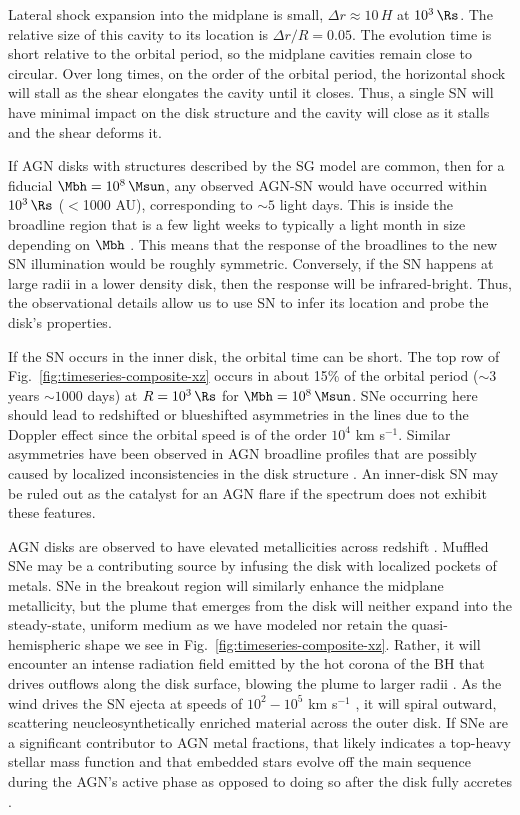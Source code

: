 Lateral shock expansion into the midplane is small, $\Delta r\approx 10\,H$ at $10^3\,\Rs$.
The relative size of this cavity to its location is $\Delta r/R = 0.05$.
The evolution time is short relative to the orbital period, so the midplane cavities remain close to circular.
Over long times, on the order of the orbital period, the horizontal shock will stall as the shear elongates the cavity until it closes.
Thus, a single SN will have minimal impact on the disk structure and the cavity will close as it stalls and the shear deforms it.

If AGN disks with structures described by the SG model are common, then for a fiducial $\Mbh=10^8\,\Msun$, any observed AGN-SN would have occurred within $10^3\,\Rs$ ($<$1000 AU), corresponding to $\sim5$ light days.
This is inside the broadline region that is a few light weeks to typically a light month in size depending on $\Mbh$ \citep{BlandfordMcKee82}.
This means that the response of the broadlines to the new SN illumination would be roughly symmetric.
Conversely, if the SN happens at large radii in a lower density disk, then the response will be infrared-bright.
Thus, the observational details allow us to use SN to infer its location and probe the disk's properties.

If the SN occurs in the inner disk, the orbital time can be short.
The top row of Fig.~\ref{fig:timeseries-composite-xz} occurs in about 15\% of the orbital period ($\sim3$ years $\sim1000$ days) at $R=10^3\,\Rs$ for $\Mbh=10^8\,\Msun$.
SNe occurring here should lead to redshifted or blueshifted asymmetries in the lines due to the Doppler effect since the orbital speed is of the order $10^4$ km s$^{-1}$.
Similar asymmetries have been observed in AGN broadline profiles that are possibly caused by localized inconsistencies in the disk structure \citep[e.g., spiral arms,][]{Schimoia+17}.
An inner-disk SN may be ruled out as the catalyst for an AGN flare if the spectrum does not exhibit these features.

AGN disks are observed to have elevated metallicities across redshift \citep{Dors+14,Onoue+2020}.
Muffled SNe may be a contributing source by infusing the disk with localized pockets of metals.
SNe in the breakout region will similarly enhance the midplane metallicity, but the plume that emerges from the disk will neither expand into the steady-state, uniform medium as we have modeled nor retain the quasi-hemispheric shape we see in Fig.~\ref{fig:timeseries-composite-xz}.
Rather, it will encounter an intense radiation field emitted by the hot corona of the BH that drives outflows along the disk surface, blowing the plume to larger radii \citep{CrenshawKraemerGeorge03,ProgaKallman04}.
As the wind drives the SN ejecta at speeds of $10^2-10^5$ km s$^{-1}$ \citep{Parker+17,Mehdipour+17}, it will spiral outward, scattering neucleosynthetically enriched material across the outer disk.
If SNe are a significant contributor to AGN metal fractions, that likely indicates a top-heavy stellar mass function \citep{FanWu23} and that embedded stars evolve off the main sequence during the AGN's active phase \citep{HuangLinShields23} as opposed to doing so after the disk fully accretes \citep{CantielloJermynLin21}.


